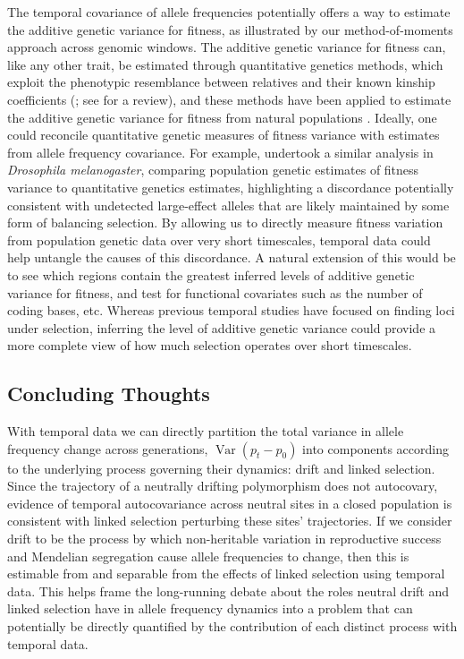 \documentclass[11pt]{article}
\DeclareMathOperator{\var}{Var}
\begin{document}
The temporal covariance of allele frequencies potentially offers a way to
estimate the additive genetic variance for fitness, as illustrated by our
method-of-moments approach across genomic windows. The additive genetic
variance for fitness can, like any other trait, be estimated through
quantitative genetics methods, which exploit the phenotypic resemblance between
relatives and their known kinship coefficients
(\cite{Kruuk2004-zk,Shaw2013-rx}; see \cite{Hendry2018-se} for a review), and
these methods have been applied to estimate the additive genetic variance for
fitness from natural populations \parencite{Burt1995-dd,Mousseau1987-uy,}.
Ideally, one could reconcile quantitative genetic measures of fitness variance
with estimates from allele frequency covariance. For example,
\textcite{Charlesworth2015-am} undertook a similar analysis in \emph{Drosophila
melanogaster}, comparing population genetic estimates of fitness variance to
quantitative genetics estimates, highlighting a discordance potentially
consistent with undetected large-effect alleles that are likely maintained by
some form of balancing selection. By allowing us to directly measure fitness
variation from population genetic data over very short timescales, temporal
data could help untangle the causes of this discordance. A natural extension of
this would be to see which regions contain the greatest inferred levels of
additive genetic variance for fitness, and test for functional covariates such
as the number of coding bases, etc. Whereas previous temporal studies have
focused on finding loci under selection, inferring the level of additive
genetic variance could provide a more complete view of how much selection
operates over short timescales.

\subsection{Concluding Thoughts}

With temporal data we can directly partition the total variance in allele
frequency change across generations, $\var(p_t-p_0)$ into components according
to the underlying process governing their dynamics: drift and linked selection.
Since the trajectory of a neutrally drifting polymorphism does not autocovary,
evidence of temporal autocovariance across neutral sites in a closed population
is consistent with linked selection perturbing these sites' trajectories. If we
consider drift to be the process by which non-heritable variation in
reproductive success and Mendelian segregation cause allele frequencies to
change, then this is estimable from and separable from the effects of linked
selection using temporal data. This helps frame the long-running debate about
the roles neutral drift and linked selection have in allele frequency dynamics
into a problem that can potentially be directly quantified by the contribution
of each distinct process with temporal data.
\end{document}
